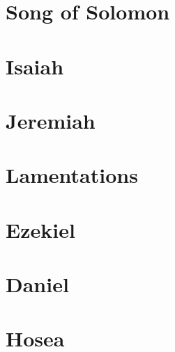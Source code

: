 \chapter{Song of Solomon}
\begin{multicols}{2}
  \raggedcolumns
  \parskip=0pt \relax
  
\end{multicols}

\chapter{Isaiah}
\begin{multicols}{2}
  \raggedcolumns
  \parskip=0pt \relax
  
\end{multicols}

\chapter{Jeremiah}
\begin{multicols}{2}
  \raggedcolumns
  \parskip=0pt \relax
  
\end{multicols}

\chapter{Lamentations}
\begin{multicols}{2}
  \raggedcolumns
  \parskip=0pt \relax
  
\end{multicols}

\chapter{Ezekiel}
\begin{multicols}{2}
  \raggedcolumns
  \parskip=0pt \relax
  
\end{multicols}

\chapter{Daniel}
\begin{multicols}{2}
  \raggedcolumns
  \parskip=0pt \relax
  
\end{multicols}

\chapter{Hosea}
\begin{multicols}{2}
  \raggedcolumns
  \parskip=0pt \relax
  
\end{multicols}


